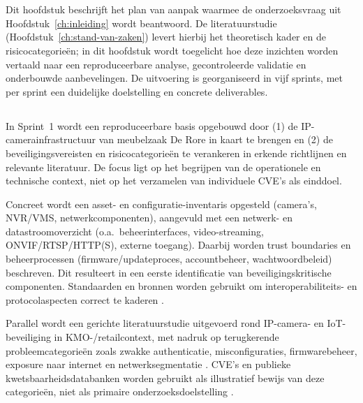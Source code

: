 
\chapter{}%
\label{ch:methodologie}

Dit hoofdstuk beschrijft het plan van aanpak waarmee de onderzoeksvraag uit Hoofdstuk~\ref{ch:inleiding} wordt beantwoord. De literatuurstudie (Hoofdstuk~\ref{ch:stand-van-zaken}) levert hierbij het theoretisch kader en de risicocategorieën; in dit hoofdstuk wordt toegelicht hoe deze inzichten worden vertaald naar een reproduceerbare analyse, gecontroleerde validatie en onderbouwde aanbevelingen. De uitvoering is georganiseerd in vijf sprints, met per sprint een duidelijke doelstelling en concrete deliverables.

\section{}%
\label{sec:meth-sprint1}

In Sprint~1 wordt een reproduceerbare basis opgebouwd door (1) de IP-camerainfrastructuur van meubelzaak De Rore in kaart te brengen en (2) de beveiligingsvereisten en risicocategorieën te verankeren in erkende richtlijnen en relevante literatuur. De focus ligt op het begrijpen van de operationele en technische context, niet op het verzamelen van individuele CVE’s als einddoel.

Concreet wordt een asset- en configuratie-inventaris opgesteld (camera’s, NVR/VMS, netwerkcomponenten), aangevuld met een netwerk- en datastroomoverzicht (o.a.\ beheerinterfaces, video-streaming, ONVIF/RTSP/HTTP(S), externe toegang). Daarbij worden trust boundaries en beheerprocessen (firmware/updateproces, accountbeheer, wachtwoordbeleid) beschreven. Dit resulteert in een eerste identificatie van beveiligingskritische componenten. Standaarden en bronnen worden gebruikt om interoperabiliteits- en protocolaspecten correct te kaderen \autocite{ONVIFCoreSpec2025}.

Parallel wordt een gerichte literatuurstudie uitgevoerd rond IP-camera- en IoT-beveiliging in KMO-/retailcontext, met nadruk op terugkerende probleemcategorieën zoals zwakke authenticatie, misconfiguraties, firmwarebeheer, exposure naar internet en netwerksegmentatie \autocite{Butun2019arXivIoTSecurity,ENISA2024ThreatLandscape}. CVE’s en publieke kwetsbaarheidsdatabanken worden gebruikt als illustratief bewijs van deze categorieën, niet als primaire onderzoeksdoelstelling \autocite{NVD2025}.

